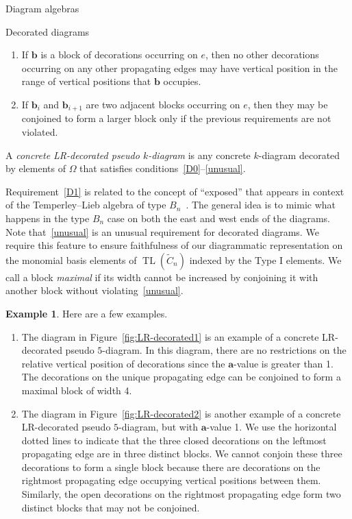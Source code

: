 \documentclass[11pt]{amsart}
\theoremstyle{definition}
\newtheorem{example}[theorem]{Example}
\numberwithin{equation}{section}
\newcommand{\C}{\widetilde{C}}
\renewcommand{\a}{\mathbf{a}}
\DeclareMathOperator{\TL}{TL}
\renewcommand{\(}{\left(}
\renewcommand{\)}{\right)}
\begin{document}
\begin{section}{Diagram algebras}
\begin{subsection}{Decorated diagrams}
\begin{enumerate}[label=\rm{(D\arabic*)}]
\begin{enumerate}
\item If $\mathbf{b}$ is a block of decorations occurring on $e$, then no other decorations occurring on any other propagating edges may have vertical position in the range of vertical positions that $\mathbf{b}$ occupies.

\item If $\mathbf{b}_{i}$ and $\mathbf{b}_{i+1}$ are two adjacent blocks occurring on $e$, then they may be conjoined to form a larger block only if the previous requirements are not violated.
\end{enumerate}
\end{enumerate}
A \emph{concrete LR-decorated pseudo $k$-diagram} is any concrete $k$-diagram decorated by elements of $\Omega$ that satisfies conditions~\ref{D0}--\ref{unusual}.

Requirement~\ref{D1} is related to the concept of ``exposed'' that appears in context of the Temperley--Lieb algebra of type $B_n$~\cite{Green1998a,Green2001,Green2003}.  The general idea is to mimic what happens in the type $B_n$ case on both the east and west ends of the diagrams.  Note that~\ref{unusual} is an unusual requirement for decorated diagrams.  We require this feature to ensure faithfulness of our diagrammatic representation on the monomial basis elements of $\TL(\C_{n})$ indexed by the Type I elements. We call a block \emph{maximal} if its width cannot be increased by conjoining it with another block without violating~\ref{unusual}.

\begin{example}\label{ex:decorated diagrams}
Here are a few examples.
\begin{enumerate}
\item \label{ex:decorated diagram1} The diagram in Figure~\ref{fig:LR-decorated1} is an example of a concrete LR-decorated pseudo $5$-diagram.  In this diagram, there are no restrictions on the relative vertical position of decorations since the $\a$-value is greater than 1.  The decorations on the unique propagating edge can be conjoined to form a maximal block of width 4.

\item \label{ex:decorated diagram2} The diagram in Figure~\ref{fig:LR-decorated2} is another example of a concrete LR-decorated pseudo $5$-diagram, but with $\a$-value 1.  We use the horizontal dotted lines to indicate that the three closed decorations on the leftmost propagating edge are in three distinct blocks.  We cannot conjoin these three decorations to form a single block because there are decorations on the rightmost propagating edge occupying vertical positions between them.  Similarly, the open decorations on the rightmost propagating edge form two distinct blocks that may not be conjoined.


\end{enumerate}
\end{example}
\end{subsection}
\end{section}
\end{document}
